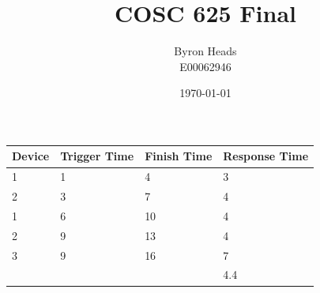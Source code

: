 \documentclass[a4paper,12pt]{article}
\title{COSC 625 Final}
\author{Byron Heads \\
		E00062946}
\date{\today}
\begin{document}
\maketitle

\section{}
\subsection{}
\begin{figure}[h!]
\end{figure}

\subsection{}
\begin{tabular}{l | l | l | l }
Device & Trigger Time & Finish Time & Response Time \\ \hline
1 & 1 & 4 & 3 \\
2 & 3 & 7 & 4 \\
1 & 6 & 10 & 4 \\
2 & 9 & 13 & 4 \\
3 & 9 & 16 & 7 \\
& & &  4.4
\end{tabular}

\newpage
\subsection{}
\begin{figure}[h!]
\end{figure}
\end{document}
